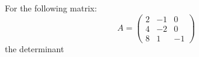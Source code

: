 \documentclass{ximera}
\author{Parisa Fatheddin}
\begin{document}
\begin{exercise}


For the following matrix:
\[
A = \begin{pmatrix}
2 & -1 & 0 \\
4 & -2 & 0 \\
8 & 1 & -1
\end{pmatrix}
\]
the determinant
\begin{multipleChoice}
\end{multipleChoice}



\end{exercise}
\end{document}

